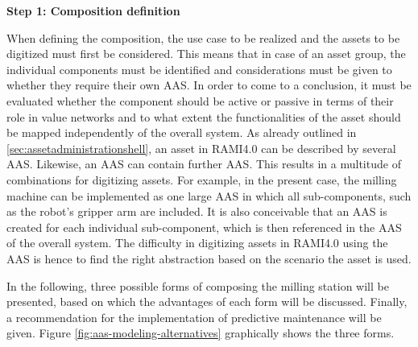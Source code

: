 \textbf{Step 1: Composition definition}

When defining the composition, the use case to be realized and the assets to be digitized must first be considered. This means that in case of an asset group, the individual components must be identified and considerations must be given to whether they require their own \ac{AAS}. In order to come to a conclusion, it must be evaluated whether the component should be active or passive in terms of their role in value networks and to what extent the functionalities of the asset should be mapped independently of the overall system. As already outlined in \ref{sec:assetadministrationshell}, an asset in \ac{RAMI4.0} can be described by several \ac{AAS}. Likewise, an \ac{AAS} can contain further \ac{AAS}. This results in a multitude of combinations for digitizing assets. For example, in the present case, the milling machine can be implemented as one large \ac{AAS} in which all sub-components, such as the robot's gripper arm are included. It is also conceivable that an \ac{AAS} is created for each individual sub-component, which is then referenced in the \ac{AAS} of the overall system. The difficulty in digitizing assets in \ac{RAMI4.0} using the \ac{AAS} is hence to find the right abstraction based on the scenario the asset is used. 

In the following, three possible forms of composing the milling station will be presented, based on which the advantages of each form will be discussed. Finally, a recommendation for the implementation of predictive maintenance will be given. Figure \ref{fig:aas-modeling-alternatives} graphically shows the three forms.

